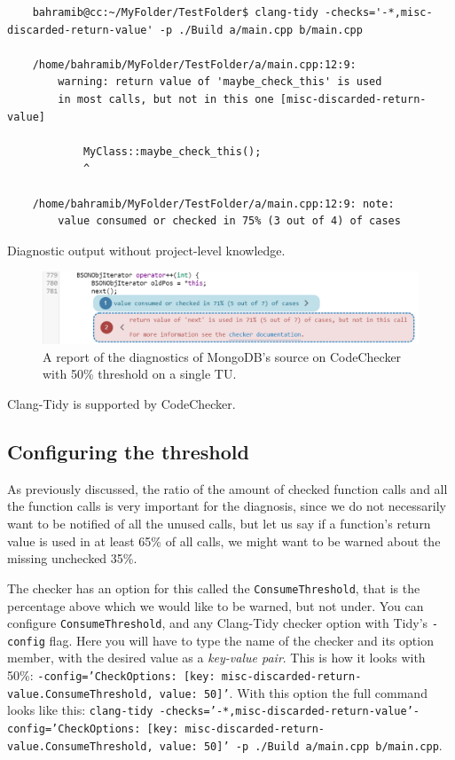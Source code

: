 \begin{listing}[H]
	\begin{verbatim}
	bahramib@cc:~/MyFolder/TestFolder$ clang-tidy -checks='-*,misc-discarded-return-value' -p ./Build a/main.cpp b/main.cpp

	/home/bahramib/MyFolder/TestFolder/a/main.cpp:12:9:
		warning: return value of 'maybe_check_this' is used
		in most calls, but not in this one [misc-discarded-return-value]

			MyClass::maybe_check_this();
			^

	/home/bahramib/MyFolder/TestFolder/a/main.cpp:12:9: note:
		value consumed or checked in 75% (3 out of 4) of cases
	\end{verbatim}
\caption{Diagnostic output without project-level knowledge.}
\end{listing}



\begin{figure}[H]
	\includegraphics[width=\linewidth]{images/codechecker_first_ss_mongo_single_50.png}
	\caption{A report of the diagnostics of MongoDB's source on CodeChecker with 50\% threshold on a single TU.}
	\label{fig:mongo50single}
\end{figure}

Clang-Tidy is supported by CodeChecker.~\cite{codechecker}

\subsection{Configuring the threshold}

As previously discussed, the ratio of the amount of checked function calls and all the function calls is very important for the
diagnosis, since we do not necessarily want to be notified of all the unused calls, but let us say if a function's return value
is used in at least 65\% of all calls, we might want to be warned about the missing unchecked 35\%.

The checker has an option for this called the \texttt{ConsumeThreshold}, that is the percentage above which we would like to be warned,
but not under.
You can configure \texttt{ConsumeThreshold}, and any Clang-Tidy checker option with Tidy's \texttt{-config} flag. Here you will have to type
the name of the checker and its option member, with the desired value as a \emph{key-value pair}. This is how it looks with 50\%:
\texttt{-config='{CheckOptions: [{key: misc-discarded-return-value.ConsumeThreshold, value: 50}]}'}. With this option the full
command looks like this:
\texttt{clang-tidy -checks='-*,misc-discarded-return-value'-config='{CheckOptions: [{key: misc-discarded-return-value.ConsumeThreshold, value: 50}]}' -p ./Build a/main.cpp b/main.cpp}.

